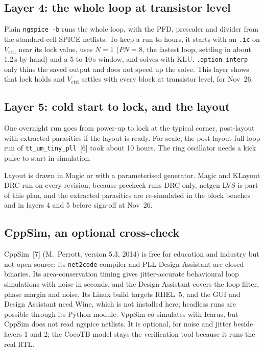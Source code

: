 \documentclass[11pt]{article}
\newcommand{\pin}[1]{\texttt{#1}}              %
\newcommand{\us}{\,\textmu s}
\newcommand{\vctrl}{V_\mathrm{ctrl}}
\begin{document}
\subsection{Layer 4: the whole loop at transistor level}
Plain \pin{ngspice -b} runs the whole loop, with the PFD, prescaler and divider from the standard-cell SPICE netlists. To keep a run to hours, it starts with an \pin{.ic} on $\vctrl$ near its lock value, uses $N = 1$ ($PN = 8$, the fastest loop, settling in about 1.2\us{} by hand) and a 5 to 10\us{} window, and solves with KLU. \pin{.option interp} only thins the saved output and does not speed up the solve. This layer shows that lock holds and $\vctrl$ settles with every block at transistor level, for Nov~26.

\subsection{Layer 5: cold start to lock, and the layout}
One overnight run goes from power-up to lock at the typical corner, post-layout with extracted parasitics if the layout is ready. For scale, the post-layout full-loop run of \pin{tt\_um\_tiny\_pll}~[6] took about 10 hours. The ring oscillator needs a kick pulse to start in simulation.

Layout is drawn in Magic or with a parameterised generator. Magic and KLayout DRC run on every revision; because precheck runs DRC only, netgen LVS is part of this plan, and the extracted parasitics are re-simulated in the block benches and in layers 4 and 5 before sign-off at Nov~26.

\subsection{CppSim, an optional cross-check}
CppSim~[7] (M.~Perrott, version 5.3, 2014) is free for education and industry but not open source: its \pin{net2code} compiler and PLL Design Assistant are closed binaries. Its area-conservation timing gives jitter-accurate behavioural loop simulations with noise in seconds, and the Design Assistant covers the loop filter, phase margin and noise. Its Linux build targets RHEL~5, and the GUI and Design Assistant need Wine, which is not installed here; headless runs are possible through its Python module. VppSim co-simulates with Icarus, but CppSim does not read ngspice netlists. It is optional, for noise and jitter beside layers 1 and 2; the CocoTB model stays the verification tool because it runs the real RTL.
\end{document}
